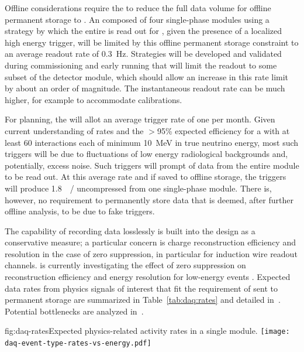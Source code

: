 Offline considerations require the  to reduce the
full  data volume for offline permanent storage to  \offsitepbpy.
An  composed of four single-phase modules using a
strategy by which the entire  is read out for \spreadout, 
given the presence of a localized high energy trigger, will be limited
by this offline permanent storage constraint to an average readout rate of \SI{0.3}{\hertz}. 
Strategies will be developed and validated during commissioning and early running that will limit the readout to some subset of the detector module, which should allow an increase in this rate limit by about an order of magnitude.
The instantaneous readout rate can be much higher, for example to accommodate calibrations.


For planning, the  will allot an average  trigger rate of one per month.
Given current understanding of  rates and the $>$95\%
expected efficiency for a  with at least 60 interactions
each of minimum \SI{10}{\MeV} in true neutrino energy, most such triggers will be due to fluctuations
of low energy radiological backgrounds and, potentially, excess
noise. 
Such triggers will prompt \snbtime of data from the entire module to be read out.
At this average rate and if saved to offline storage, the 
triggers will produce \SI{1.8}{\peta\byte/\year} uncompressed from one
single-phase module. There is, however, no requirement to
permanently store 
data that is deemed, after further offline analysis, to be due to fake triggers.

The capability of recording data losslessly is built into the design
as a conservative measure; a particular concern is charge reconstruction
efficiency and resolution in the case of zero suppression, in particular for 
induction wire readout channels.
 is currently investigating the effect of zero suppression
on reconstruction efficiency and energy resolution for low-energy
events \cite{bib:uBsnreadout2019}.
Expected data rates from physics signals of interest that fit the
requirement of \offsitepbpy sent to permanent storage are summarized in Table~\ref{tab:daq:rates} and detailed in~. Potential bottlenecks are analyzed in~.

\begin{dunefigure}{fig:daq-rates}{Expected physics-related activity
    rates in a single \nominalmodsize module.
}
  \texttt{[image: daq-event-type-rates-vs-energy.pdf]}
\end{dunefigure}

